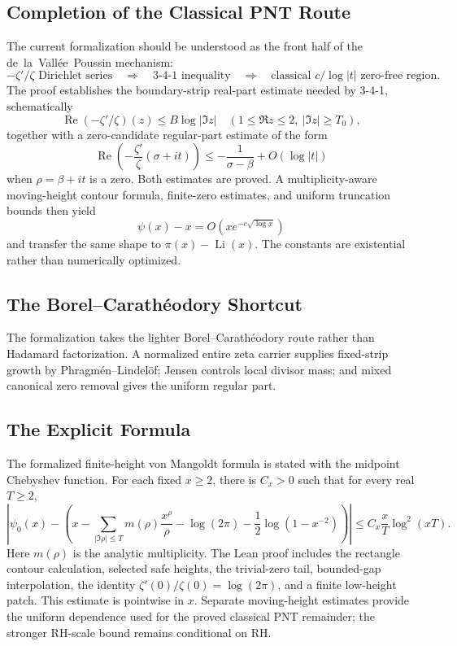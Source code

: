 \documentclass[11pt,a4paper]{article}
\theoremstyle{remark}
\begin{document}
\subsection{Completion of the Classical PNT Route}

The current formalization should be understood as the front half of the
de~la~Vall\'ee~Poussin mechanism:
\[
  -\zeta'/\zeta \text{ Dirichlet series}
  \quad\Longrightarrow\quad
  \text{3-4-1 inequality}
  \quad\Longrightarrow\quad
  \text{classical }c/\log|t|\text{ zero-free region}.
\]
The proof establishes the boundary-strip real-part estimate needed by 3-4-1,
schematically
\[
  \operatorname{Re}(-\zeta'/\zeta)(z)
    \leq B \log |\Im z|
  \quad
  (1 \leq \Re z \leq 2,\ |\Im z|\geq T_0),
\]
together with a zero-candidate regular-part estimate of the form
\[
  \operatorname{Re}\!\left(-\frac{\zeta'}{\zeta}(\sigma+it)\right)
    \leq -\frac{1}{\sigma-\beta} + O(\log |t|)
\]
when \(\rho=\beta+it\) is a zero.  Both estimates are proved.  A
multiplicity-aware moving-height contour formula, finite-zero estimates, and
uniform truncation bounds then yield
\[
  \psi(x)-x=O\!\left(xe^{-c\sqrt{\log x}}\right)
\]
and transfer the same shape to \(\pi(x)-\operatorname{Li}(x)\).  The constants
are existential rather than numerically optimized.

\subsection{The Borel--Carath\'eodory Shortcut}

The formalization takes the lighter Borel--Carath\'eodory route rather than
Hadamard factorization.  A normalized entire zeta carrier supplies fixed-strip
growth by Phragm\'en--Lindel\"of; Jensen controls local divisor mass; and mixed
canonical zero removal gives the uniform regular part.

\subsection{The Explicit Formula}

The formalized finite-height von Mangoldt formula is stated with the midpoint
Chebyshev function.  For each fixed \(x\ge2\), there is \(C_x>0\) such that
for every real \(T\ge2\),
\[
\left|\psi_0(x)-\left(x-\sum_{|\Im\rho|\le T}
  m(\rho)\frac{x^\rho}{\rho}-\log(2\pi)
  -\frac12\log(1-x^{-2})\right)\right|
\le C_x\frac{x}{T}\log^2(xT).
\]
Here \(m(\rho)\) is the analytic multiplicity.  The Lean proof includes the
rectangle contour calculation, selected safe heights, the trivial-zero tail,
bounded-gap interpolation, the identity
\(\zeta'(0)/\zeta(0)=\log(2\pi)\), and a finite low-height patch.  This estimate
is pointwise in \(x\).  Separate moving-height estimates provide the uniform
dependence used for the proved classical PNT remainder; the stronger RH-scale
bound remains conditional on RH.
\end{document}
